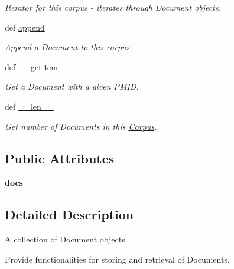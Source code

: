 \begin{DoxyCompactItemize}
\begin{DoxyCompactList}\small\item\em Iterator for this corpus -\/ iterates through Document objects. \end{DoxyCompactList}\item 
def \hyperlink{classgographer_1_1_corpus_1_1_corpus_aac2af9f40109ac25a36ca4cc27ea2029}{append}
\begin{DoxyCompactList}\small\item\em Append a Document to this corpus. \end{DoxyCompactList}\item 
def \hyperlink{classgographer_1_1_corpus_1_1_corpus_a11903a72586876c941db6ad4908f1ab5}{\-\_\-\-\_\-getitem\-\_\-\-\_\-}
\begin{DoxyCompactList}\small\item\em Get a Document with a given P\-M\-I\-D. \end{DoxyCompactList}\item 
def \hyperlink{classgographer_1_1_corpus_1_1_corpus_a442131a1f4da706243217430b67602b6}{\-\_\-\-\_\-len\-\_\-\-\_\-}
\begin{DoxyCompactList}\small\item\em Get number of Documents in this \hyperlink{classgographer_1_1_corpus_1_1_corpus}{Corpus}. \end{DoxyCompactList}\end{DoxyCompactItemize}
\subsection*{Public Attributes}
\begin{DoxyCompactItemize}
\item 
\hypertarget{classgographer_1_1_corpus_1_1_corpus_a24619795784a6267426112c64bcfb068}{{\bfseries docs}}\label{classgographer_1_1_corpus_1_1_corpus_a24619795784a6267426112c64bcfb068}

\end{DoxyCompactItemize}


\subsection{Detailed Description}
A collection of Document objects. 

Provide functionalities for storing and retrieval of Documents. 

